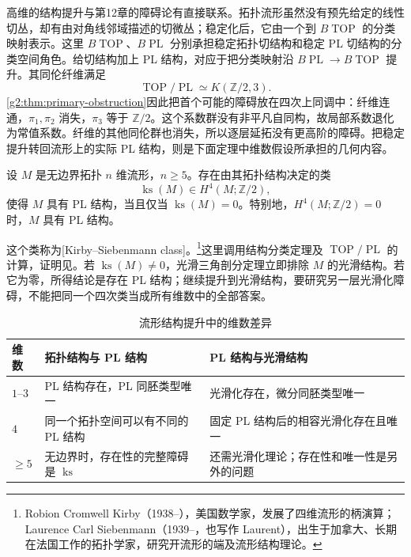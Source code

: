 \ProseParagraphBreak

高维的结构提升与第12章的障碍论有直接联系。拓扑流形虽然没有预先给定的线性切丛，却有由对角线邻域描述的切微丛；稳定化后，它由一个到 \(B\operatorname{TOP}\) 的分类映射表示。这里 \(B\operatorname{TOP}\)、\(B\operatorname{PL}\) 分别承担稳定拓扑切结构和稳定 PL 切结构的分类空间角色。给切结构加上 PL 结构，对应于把分类映射沿 \(B\operatorname{PL}\rightarrow B\operatorname{TOP}\) 提升。其同伦纤维满足
\[
	\operatorname{TOP}/\operatorname{PL}\simeq K(\mathbb Z/2,3).
\]
\cref{g2:thm:primary-obstruction}因此把首个可能的障碍放在四次上同调中：纤维连通，\(\pi_1,\pi_2\) 消失，\(\pi_3\) 等于 \(\mathbb Z/2\)。这个系数群没有非平凡自同构，故局部系数退化为常值系数。纤维的其他同伦群也消失，所以逐层延拓没有更高阶的障碍。把稳定提升转回流形上的实际 PL 结构，则是下面定理中维数假设所承担的几何内容。

\begin{theorem}\label{g2:thm:kirby-siebenmann-obstruction}
	设 \(M\) 是无边界拓扑 \(n\) 维流形，\(n\ge5\)。存在由其拓扑结构决定的类
	\[
		\operatorname{ks}(M)\in H^4(M;\mathbb Z/2),
	\]
	使得 \(M\) 具有 PL 结构，当且仅当 \(\operatorname{ks}(M)=0\)。特别地，\(H^4(M;\mathbb Z/2)=0\) 时，\(M\) 具有 PL 结构。
\end{theorem}

这个类称为[Kirby--Siebenmann class]。\footnote{Robion Cromwell Kirby（1938--），美国数学家，发展了四维流形的柄演算；Laurence Carl Siebenmann（1939--，也写作 Laurent），出生于加拿大、长期在法国工作的拓扑学家，研究开流形的端及流形结构理论。}这里调用结构分类定理及 \(\operatorname{TOP}/\operatorname{PL}\) 的计算，证明见\cite[Essay V，定理5.5及第5.6段，第251--253页]{KirbySiebenmann1977}。若 \(\operatorname{ks}(M)\ne0\)，光滑三角剖分定理立即排除 \(M\) 的光滑结构。若它为零，所得结论是存在 PL 结构；继续提升到光滑结构，要研究另一层光滑化障碍，不能把同一个四次类当成所有维数中的全部答案。

\begin{table}[htbp]
	\centering
	\caption{流形结构提升中的维数差异}
	\label{g2:tab:manifold-categories}
	\begin{tabularx}{\textwidth}{@{}p{}XX@{}}
		\toprule
		维数 & 拓扑结构与 PL 结构 & PL 结构与光滑结构 \\
		\midrule
		\(1\)--\(3\) & PL 结构存在，PL 同胚类型唯一 & 光滑化存在，微分同胚类型唯一 \\
		\(4\) & 同一个拓扑空间可以有不同的 PL 结构 & 固定 PL 结构后的相容光滑化存在且唯一 \\
		\(\ge5\) & 无边界时，存在性的完整障碍是 \(\operatorname{ks}\) & 还需光滑化理论；存在性和唯一性是另外的问题 \\
		\bottomrule
	\end{tabularx}
\end{table}

